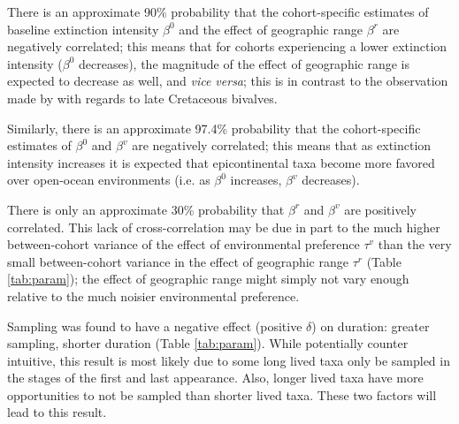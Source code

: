 \documentclass[11pt]{article}
\begin{document}
There is an approximate 90\% probability that the cohort-specific estimates of baseline extinction intensity \(\beta^{0}\) and the effect of geographic range \(\beta^{r}\) are negatively correlated; this means that for cohorts experiencing a lower extinction intensity (\(\beta^{0}\) decreases), the magnitude of the effect of geographic range is expected to decrease as well, and \textit{vice versa}; this is in contrast to the observation made by \citet{Jablonski1986} with regards to late Cretaceous bivalves.

Similarly, there is an approximate 97.4\% probability that the cohort-specific estimates of \(\beta^{0}\) and \(\beta^{v}\) are negatively correlated; this means that as extinction intensity increases it is expected that epicontinental taxa become more favored over open-ocean environments (i.e. as \(\beta^{0}\) increases, \(\beta^{v}\) decreases). 

There is only an approximate 30\% probability that \(\beta^{r}\) and \(\beta^{v}\) are positively correlated. This lack of cross-correlation may be due in part to the much higher between-cohort variance of the effect of environmental preference \(\tau^{v}\) than the very small between-cohort variance in the effect of geographic range \(\tau^{r}\) (Table \ref{tab:param}); the effect of geographic range might simply not vary enough relative to the much noisier environmental preference.


Sampling was found to have a negative effect (positive \(\delta\)) on duration: greater sampling, shorter duration (Table \ref{tab:param}). While potentially counter intuitive, this result is most likely due to some long lived taxa only be sampled in the stages of the first and last appearance. Also, longer lived taxa have more opportunities to not be sampled than shorter lived taxa. These two factors will lead to this result. 
\end{document}
